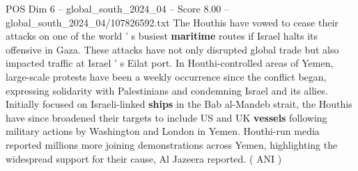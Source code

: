 \begin{textsample}{POS Dim 6 – global\_south\_2024\_04 – Score 8.00 – global\_south\_2024\_04/107826592.txt}
The Houthis have vowed to cease their attacks on one of the world ' s busiest \textbf{maritime} routes if Israel halts its offensive in Gaza.
These attacks have not only disrupted global trade but also impacted traffic at Israel ' s Eilat port.
In Houthi-controlled areas of Yemen, large-scale protests have been a weekly occurrence since the conflict began, expressing solidarity with Palestinians and condemning Israel and its allies.
Initially focused on Israeli-linked \textbf{ships} in the Bab al-Mandeb strait, the Houthis have since broadened their targets to include US and UK \textbf{vessels} following military actions by Washington and London in Yemen.
Houthi-run media reported millions more joining demonstrations across Yemen, highlighting the widespread support for their cause, Al Jazeera reported. ( ANI )

\end{textsample}
